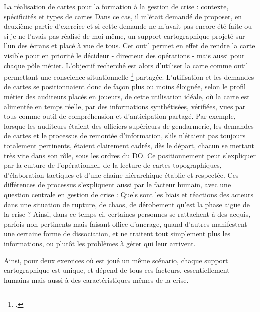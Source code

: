 \documentclass[10pt,a4paper]{report} %
\begin{document}
\begin{part}{La réalisation de cartes pour la formation à la gestion de crise : contexte, spécificités et types de cartes}
Dans ce cas, il m’était demandé de proposer, en deuxième partie d’exercice et si cette demande ne m’avait pas encore été faite ou si je ne l’avais pas réalisé de moi-même, un support cartographique projeté sur l’un des écrans et placé à vue de tous. Cet outil permet en effet de rendre la carte visible pour en priorité le décideur - directeur des opérations - mais aussi pour chaque pôle métier. L’objectif recherché est alors d’utiliser la carte comme outil permettant une conscience situationnelle \footcite{officequebecoisdelalanguefrancaiseGrandDictionnaireTerminologique} partagée. L’utilisation et les demandes de cartes se positionnaient donc de façon plus ou moins éloignée, selon le profil métier des auditeurs placés en joueurs, de cette utilisation idéale, où la carte est alimentée en temps réelle, par des informations synthétisées, vérifiées, vues par tous comme outil de compréhension et d’anticipation partagé.  Par exemple, lorsque les auditeurs étaient des officiers supérieurs de gendarmerie, les demandes de cartes et le processus de remontée d’information, s’ils n’étaient pas toujours totalement pertinents, étaient clairement cadrés, dès le départ, chacun se mettant très vite dans son rôle, sous les ordres du DO. Ce positionnement peut s’expliquer par la culture de l’opérationnel, de la lecture de cartes topographiques, d’élaboration tactiques et d’une chaîne hiérarchique établie et respectée. Ces différences de processus s’expliquent aussi par le facteur humain, avec une question centrale en gestion de crise : Quels sont les biais et réactions des acteurs dans une situation de rupture, de chaos, de dérobement qu’est la phase aigüe de la crise ? Ainsi, dans ce temps-ci, certaines personnes se rattachent à des acquis, parfois non-pertinents mais faisant office d’ancrage, quand d’autres manifestent une certaine forme de dissociation, et ne traitent tout simplement plus les informations, ou plutôt les problèmes à gérer qui leur arrivent.

Ainsi, pour deux exercices où est joué un même scénario, chaque support cartographique est unique, et dépend de tous ces facteurs, essentiellement humains mais aussi à des caractéristiques mêmes de la crise.


\end{part}
\end{document}
